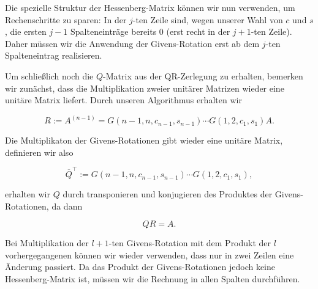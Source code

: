 \documentclass{article}
\begin{document}
Die spezielle Struktur der Hessenberg-Matrix können wir nun verwenden, um Rechenschritte zu sparen: In der $j$-ten Zeile sind, wegen unserer Wahl von $c$ und $s$, die ersten $j-1$ Spalteneinträge bereits $0$ (erst recht in der $j+1$-ten Zeile). Daher müssen wir die Anwendung der Givens-Rotation erst ab dem $j$-ten Spalteneintrag realisieren.

Um schließlich noch die $Q$-Matrix aus der QR-Zerlegung zu erhalten, bemerken wir zunächst, dass die Multiplikation zweier unitärer Matrizen wieder eine unitäre Matrix liefert. Durch unseren Algorithmus erhalten wir

$$
R := A^{(n-1)} = G(n-1,n,c_{n-1},s_{n-1})\cdots G(1,2, c_1, s_1) A.
$$

Die Multiplikaton der Givens-Rotationen gibt wieder eine unitäre Matrix, definieren wir also

$$
\overline{Q}^\top := G(n-1,n,c_{n-1},s_{n-1})\cdots G(1,2, c_1, s_1),
$$

erhalten wir $Q$ durch transponieren und konjugieren des Produktes der Givens-Rotationen, da dann

$$
QR = A.
$$

Bei Multiplikation der $l+1$-ten Givens-Rotation mit dem Produkt der $l$ vorhergegangenen können wir wieder verwenden, dass nur in zwei Zeilen eine Änderung passiert. Da das Produkt der Givens-Rotationen jedoch keine Hessenberg-Matrix ist, müssen wir die Rechnung in allen Spalten durchführen.
\end{document}
